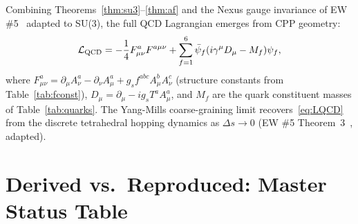 \documentclass[11pt,a4paper]{article}
\begin{document}
Combining Theorems~\ref{thm:su3}--\ref{thm:af} and the
Nexus gauge invariance of EW \#5~\citep{cpp_ew5} adapted to SU(3),
the full QCD Lagrangian emerges from CPP geometry:
\begin{equation}
\mathcal{L}_{\rm QCD}
= -\frac{1}{4}F^a_{\mu\nu}F^{a\mu\nu}
+ \sum_{f=1}^{6}\bar{\psi}_f(i\gamma^\mu D_\mu - M_f)\psi_f,
\label{eq:LQCD}
\end{equation}
where $F^a_{\mu\nu} = \partial_\mu A^a_\nu - \partial_\nu A^a_\mu
+ g_s f^{abc}A^b_\mu A^c_\nu$ (structure constants from
Table~\ref{tab:fconst}), $D_\mu = \partial_\mu - ig_s T^a A^a_\mu$,
and $M_f$ are the quark constituent masses of Table~\ref{tab:quarks}.
The Yang-Mills coarse-graining limit recovers~\eqref{eq:LQCD} from
the discrete tetrahedral hopping dynamics as $\Delta s \to 0$
(EW \#5 Theorem~3~\citep{cpp_ew5}, adapted).

\section{Derived vs.\ Reproduced: Master Status Table}
\label{sec:status}
\end{document}
